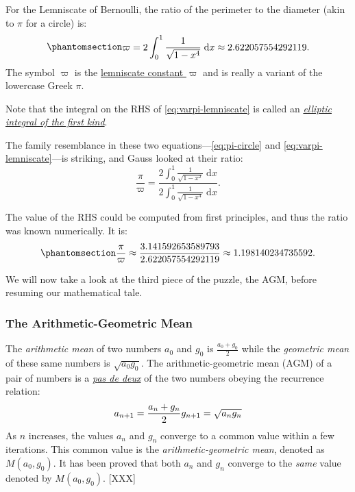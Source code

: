 \documentclass[
  a4paper,
]{article}
\begin{document}
For the Lemniscate of Bernoulli, the ratio of the perimeter to the
diameter (akin to \(\pi\) for a circle) is:
\begin{equation}\phantomsection\label{eq:varpi-lemniscate}{
\begin{aligned}
\varpi = 2\int_0^1 \frac{1}{\sqrt{1 - x^4}}\;\mathrm{d}x \approx 2.622057554292119.
\end{aligned}
}\end{equation} The symbol \(\varpi\) is the
\href{https://en.wikipedia.org/wiki/Lemniscate_constant}{lemniscate
constant \(\varpi\)} and is really a variant of the lowercase Greek
\(\pi\).

Note that the integral on the RHS of \cref{eq:varpi-lemniscate} is
called an
\href{https://mathworld.wolfram.com/EllipticIntegraloftheFirstKind.html}{\emph{elliptic
integral of the first kind}}.

The family resemblance in these two equations---\cref{eq:pi-circle} and
\cref{eq:varpi-lemniscate}---is striking, and Gauss looked at their
ratio: \[
\displaystyle\frac{\pi}{\varpi} = \frac{2\displaystyle\int_0^1 \frac{1}{\sqrt{1 - x^2}}\;\mathrm{d}x}{2\displaystyle\int_0^1 \frac{1}{\sqrt{1 - x^4}}\;\mathrm{d}x}.
\]

The value of the RHS could be computed from first principles, and thus
the ratio was known numerically. It is:
\begin{equation}\phantomsection\label{eq:pi-varpi-ratio}{
\frac{\pi}{\varpi} \approx \frac{3.141592653589793}{2.622057554292119} \approx 1.198140234735592.
}\end{equation}

We will now take a look at the third piece of the puzzle, the AGM,
before resuming our mathematical tale.

\subsubsection{The Arithmetic-Geometric
Mean}\label{the-arithmetic-geometric-mean}

The \emph{arithmetic mean} of two numbers \(a_0\) and \(g_0\) is
\(\frac{a_0 + g_0}{2}\) while the \emph{geometric mean} of these same
numbers is \(\sqrt{a_0 g_0}\). The arithmetic-geometric mean (AGM) of a
pair of numbers is a
\href{https://www.thefreedictionary.com/pas+de+deux}{\emph{pas de deux}}
of the two numbers obeying the recurrence relation: \[
a_{n+1} = \frac{a_n + g_n}{2}\\
g_{n+1} = \sqrt{a_n g_n}
\] As \(n\) increases, the values \(a_n\) and \(g_n\) converge to a
common value within a few iterations. This common value is the
\emph{arithmetic-geometric mean}, denoted as \(M(a_0, g_0)\). It has
been proved that both \(a_n\) and \(g_n\) converge to the \emph{same}
value denoted by \(M(a_0, g_0)\). {[}XXX{]}
\end{document}
